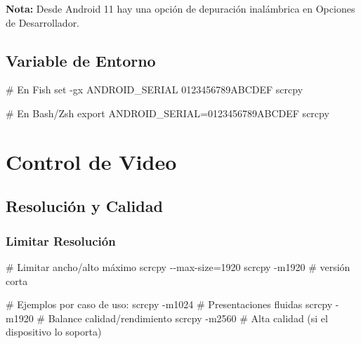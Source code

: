 \documentclass[
  doc,
  floatsintext,
  longtable,
  a4paper,
  nolmodern,
  notxfonts,
  notimes,
  12pt,
  colorlinks=true,linkcolor=blue,citecolor=blue,urlcolor=blue]{apa7}
\newenvironment{Shaded}{\begin{snugshade}}{\end{snugshade}}
\newcommand{\AttributeTok}[1]{\textcolor[rgb]{0.40,0.45,0.13}{#1}}
\newcommand{\BuiltInTok}[1]{\textcolor[rgb]{0.00,0.23,0.31}{#1}}
\newcommand{\CommentTok}[1]{\textcolor[rgb]{0.37,0.37,0.37}{#1}}
\newcommand{\ExtensionTok}[1]{\textcolor[rgb]{0.00,0.23,0.31}{#1}}
\newcommand{\NormalTok}[1]{\textcolor[rgb]{0.00,0.23,0.31}{#1}}
\newcommand{\OperatorTok}[1]{\textcolor[rgb]{0.37,0.37,0.37}{#1}}
\newcommand{\VariableTok}[1]{\textcolor[rgb]{0.07,0.07,0.07}{#1}}
\begin{document}
\textbf{Nota:} Desde Android 11 hay una opción de depuración inalámbrica
en Opciones de Desarrollador.

\subsection{Variable de Entorno}\label{variable-de-entorno}

\begin{Shaded}
\begin{Highlighting}[]
\CommentTok{\# En Fish}
\BuiltInTok{set} \AttributeTok{{-}gx}\NormalTok{ ANDROID\_SERIAL 0123456789ABCDEF}
\ExtensionTok{scrcpy}

\CommentTok{\# En Bash/Zsh}
\BuiltInTok{export} \VariableTok{ANDROID\_SERIAL}\OperatorTok{=}\NormalTok{0123456789ABCDEF}
\ExtensionTok{scrcpy}
\end{Highlighting}
\end{Shaded}

\section{Control de Video}\label{control-de-video}

\subsection{Resolución y Calidad}\label{resoluciuxf3n-y-calidad}

\subsubsection{Limitar Resolución}\label{limitar-resoluciuxf3n}

\begin{Shaded}
\begin{Highlighting}[]
\CommentTok{\# Limitar ancho/alto máximo}
\ExtensionTok{scrcpy} \AttributeTok{{-}{-}max{-}size}\OperatorTok{=}\NormalTok{1920}
\ExtensionTok{scrcpy} \AttributeTok{{-}m1920}  \CommentTok{\# versión corta}

\CommentTok{\# Ejemplos por caso de uso:}
\ExtensionTok{scrcpy} \AttributeTok{{-}m1024}  \CommentTok{\# Presentaciones fluidas}
\ExtensionTok{scrcpy} \AttributeTok{{-}m1920}  \CommentTok{\# Balance calidad/rendimiento}
\ExtensionTok{scrcpy} \AttributeTok{{-}m2560}  \CommentTok{\# Alta calidad (si el dispositivo lo soporta)}
\end{Highlighting}
\end{Shaded}
\end{document}
